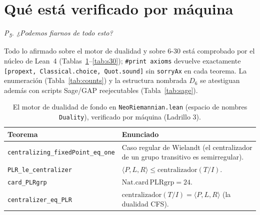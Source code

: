 \documentclass[11pt]{article}
\newcommand{\lean}[1]{\texttt{#1}}
\newcommand{\Dgrp}[1]{D_{#1}}
\newcommand{\question}[1]{\smallskip\noindent\textit{#1}\smallskip}
\begin{document}
\section{Qué está verificado por máquina}\label{sec:checked}

\question{P\textsubscript{5}. ¿Podemos fiarnos de todo esto?}

Todo lo afirmado sobre el motor de dualidad y sobre 6-30 está comprobado por el núcleo de Lean~4
(Tablas~\ref{tab:lean}--\ref{tab:s30}); \lean{\#print axioms} devuelve exactamente
\lean{[propext, Classical.choice, Quot.sound]} sin \lean{sorryAx} en cada teorema. La enumeración
(Tabla~\ref{tab:counts}) y la estructura nombrada $\Dgrp{6}$ se atestiguan además con scripts Sage/GAP
reejecutables (Tabla~\ref{tab:sage}).

\begin{table}[h]
\centering\small
{}
\begin{tabular}{@{}l p{}@{}}
\toprule
\rowcolor{ctA!22}
\textbf{Teorema} & \textbf{Enunciado}\\
\midrule
\lean{centralizing\_fixedPoint\_eq\_one} & Caso regular de Wielandt (el centralizador de un grupo transitivo es semirregular).\\
\lean{PLR\_le\_centralizer}              & $\langle P,L,R\rangle\le\mathrm{centralizador}(T/I)$.\\
\lean{card\_PLRgrp}                      & $\mathrm{Nat.card}\,\mathrm{PLRgrp}=24$.\\
\lean{centralizer\_eq\_PLR}             & $\mathrm{centralizador}(T/I)=\langle P,L,R\rangle$ (la dualidad CFS).\\
\bottomrule
\end{tabular}
\caption{El motor de dualidad de fondo en \lean{NeoRiemannian.lean} (espacio de nombres \lean{Duality}),
verificado por máquina (Ladrillo 3).}
\label{tab:lean}
\end{table}
\end{document}
